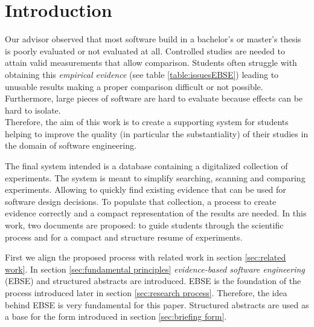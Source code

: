 

\section{Introduction}
\label{sec:introduction}

Our advisor observed that most software build in a bachelor's or master's thesis is poorly evaluated or not evaluated at all. Controlled studies are needed to attain valid measurements that allow comparison. Students often struggle with obtaining this \emph{empirical evidence} (see table \ref{table:issuesEBSE}) leading to unusable results making a proper comparison difficult or not possible. Furthermore, large pieces of software are hard to evaluate because effects can be hard to isolate.\\
Therefore, the aim of this work is to create a supporting system for students helping to improve the quality (in particular the substantiality) of their studies in the domain of software engineering.

The final system intended is a database containing a digitalized collection of experiments. The system is meant to simplify searching, scanning and comparing experiments. Allowing to quickly find existing evidence that can be used for software design decisions. To populate that collection, a process to create evidence correctly and a compact representation of the results are needed. In this work, two documents are proposed: \emph{\checklist} to guide students through the scientific process and \emph{\briefingform{}} for a compact and structure resume of experiments.

First we align the proposed process with related work in section \ref{sec:related work}. In section \ref{sec:fundamental principles} \emph{evidence-based software engineering} (EBSE) and structured abstracts are introduced. EBSE is the foundation of the process introduced later in section \ref{sec:research process}. Therefore, the idea behind EBSE is very fundamental  for this paper.
Structured abstracts are used as a base for the form introduced in section \ref{sec:briefing form}.













